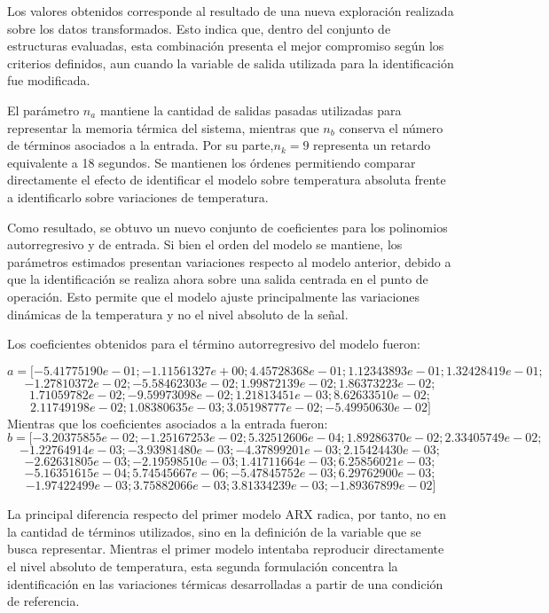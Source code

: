 \documentclass[11pt]{report}
\begin{document}
Los valores obtenidos corresponde al resultado de una nueva exploración realizada sobre los datos transformados. Esto indica que, dentro del conjunto de estructuras evaluadas, esta combinación presenta el mejor compromiso según los criterios definidos, aun cuando la variable de salida utilizada para la identificación fue modificada.


El parámetro $n_a$ mantiene la cantidad de salidas pasadas utilizadas para representar la memoria térmica del sistema, mientras que $n_b$ conserva el número de términos asociados a la entrada. Por su parte,$n_k=9$ representa un retardo equivalente a 18 segundos. Se mantienen los órdenes permitiendo comparar directamente el efecto de identificar el modelo sobre temperatura absoluta frente a identificarlo sobre variaciones de temperatura.

Como resultado, se obtuvo un nuevo conjunto de coeficientes para los polinomios autorregresivo y de entrada. Si bien el orden del modelo se mantiene, los parámetros estimados presentan variaciones respecto al modelo anterior, debido a que la identificación se realiza ahora sobre una salida centrada en el punto de operación. Esto permite que el modelo ajuste principalmente las variaciones dinámicas de la temperatura y no el nivel absoluto de la señal.

Los coeficientes obtenidos para el término autorregresivo del modelo fueron:

$$a = [   -5.41775190e-01; -1.11561327e+00;  4.45728368e-01;
     1.12343893e-01;  1.32428419e-01; $$   
     $$-1.27810372e-02; -5.58462303e-02; 1.99872139e-02;  1.86373223e-02;$$
     $$1.71059782e-02; -9.59973098e-02; 1.21813451e-03; 
     8.62633510e-02; $$
     $$2.11749198e-02; 1.08380635e-03;
     3.05198777e-02; -5.49950630e-02]$$
Mientras que los coeficientes asociados a la entrada fueron:
$$b = [-3.20375855e-02;-1.25167253e-02;  5.32512606e-04;
     1.89286370e-02; 2.33405749e-02;$$
     $$-1.22764914e-03;
    -3.93981480e-03;-4.37899201e-03; 2.15424430e-03;$$
    $$-2.62631805e-03; -2.19598510e-03;1.41711664e-03;
     6.25856021e-03;$$
     $$-5.16351615e-04; 5.74545667e-06;
    -5.47845752e-03; 6.29762900e-03; $$ 
    $$-1.97422499e-03;
     3.75882066e-03;  3.81334239e-03;-1.89367899e-02]
$$

La principal diferencia respecto del primer modelo ARX radica, por tanto, no en la cantidad de términos utilizados, sino en la definición de la variable que se busca representar. Mientras el primer modelo intentaba reproducir directamente el nivel absoluto de temperatura, esta segunda formulación concentra la identificación en las variaciones térmicas desarrolladas a partir de una condición de referencia. 
\end{document}

